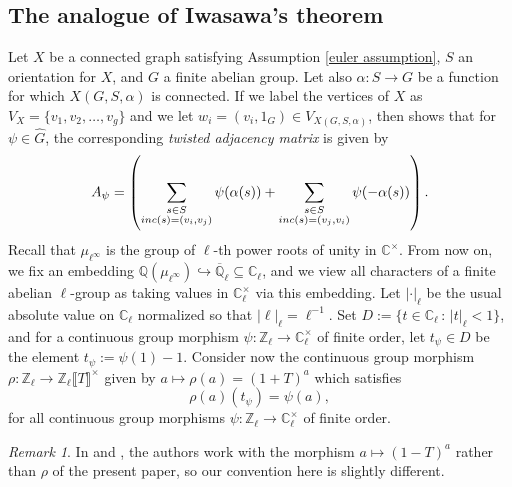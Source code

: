 \documentclass[11pt]{amsart}
\numberwithin{equation}{section}
\theoremstyle{remark}
\newtheorem{remark}[theorem]{Remark}
\begin{document}
\subsection{The analogue of Iwasawa's theorem} \label{Iw_thm}
Let $X$ be a connected graph satisfying Assumption \ref{euler assumption}, $S$ an orientation for $X$, and $G$ a finite abelian group.  Let also $\alpha:S \rightarrow G$ be a function for which $X(G,S,\alpha)$ is connected.  If we label the vertices of $X$ as $V_{X}=\{v_{1},v_{2},\ldots,v_{g} \}$ and we let $w_{i} = (v_{i},1_{G}) \in V_{X(G,S,\alpha)}$, then \cite[Corollary 5.3]{mcgownvallieresIII} shows that for $\psi \in \widehat{G}$, the corresponding \emph{twisted adjacency matrix} is given by
\begin{equation} \label{twisted_concrete}
A_{\psi} = \left(\sum_{\substack{s \in S \\ {\rm inc}(s) = (v_{i},v_{j})}}\psi(\alpha(s)) + \sum_{\substack{s \in S \\ {\rm inc}(s) = (v_{j},v_{i})}}\psi(-\alpha(s)) \right).
\end{equation}
Recall that $\mu_{\ell^{\infty}}$ is the group of $\ell$-th power roots of unity in $\mathbb{C}^{\times}$.  From now on, we fix an embedding 
$\mathbb{Q}(\mu_{\ell^{\infty}}) \hookrightarrow \overline{\mathbb{Q}}_{\ell} \subseteq \mathbb{C}_{\ell}$,
and we view all characters of a finite abelian $\ell$-group as taking values in $\mathbb{C}_{\ell}^{\times}$ via this embedding.  Let $|\cdot|_{\ell}$ be the usual absolute value on $\mathbb{C}_{\ell}$ normalized so that $|\ell|_{\ell} = \ell^{-1}$. Set 
$D := \{t \in \mathbb{C}_{\ell} \, : \, |t|_{\ell} < 1 \}$, 
and for a continuous group morphism $\psi:\mathbb{Z}_{\ell} \rightarrow \mathbb{C}_{\ell}^{\times}$ of finite order, let $t_\psi\in D$ be the element
$t_{\psi} := \psi(1) - 1$.
Consider now the continuous group morphism 
$\rho:\mathbb{Z}_{\ell} \rightarrow \mathbb{Z}_{\ell}\llbracket T \rrbracket^{\times}$ 
given by $a \mapsto \rho(a) = (1+T)^{a}$ which satisfies
\begin{equation} \label{univ_char}
\rho(a)(t_{\psi}) = \psi(a),
\end{equation}
for all continuous group morphisms $\psi:\mathbb{Z}_{\ell} \rightarrow \mathbb{C}_{\ell}^{\times}$ of finite order.  
\begin{remark}
In \cite{mcgownvallieresIII} and \cite{Sage/Vallieres:2022}, the authors work with the morphism $a \mapsto (1-T)^{a}$ rather than $\rho$ of the present paper, so our convention here is slightly different.
\end{remark}
\end{document}

